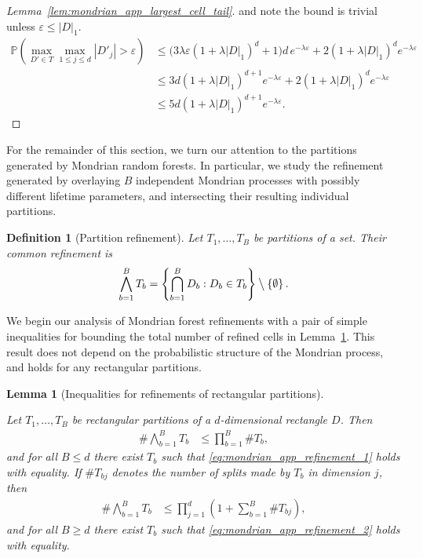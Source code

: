 \documentclass[11pt,lof]{puthesis}
\renewcommand{\P}{\ensuremath{\mathbb{P}}}
\newcommand{\bigsetminus}{\mathbin{\big\backslash}}
\theoremstyle{break}
\newtheorem{lemma}{Lemma}[section]
\newtheorem{definition}{Definition}[section]
\theoremstyle{proof}
\newtheorem{proof}{Proof}
\begin{document}
\begin{proof}[Lemma~\ref{lem:mondrian_app_largest_cell_tail}]
  and note the bound is trivial unless $\varepsilon \leq |D|_1$.
  \begin{align*}
    \P\left(
      \max_{D' \in T}
      \max_{1 \leq j \leq d}
      |D'_j| > \varepsilon
    \right)
    &\leq
    \big( 3 \lambda \varepsilon (1 + \lambda |D|_1)^d + 1 \big)
    d \, e^{-\lambda \varepsilon}
    + 2 (1 + \lambda |D|_1)^d
    e^{-\lambda \varepsilon} \\
    &\leq
    3d (1 + \lambda |D|_1)^{d+1}
    e^{-\lambda \varepsilon}
    + 2 (1 + \lambda |D|_1)^d
    e^{-\lambda \varepsilon} \\
    &\leq
    5d (1 + \lambda |D|_1)^{d+1}
    e^{-\lambda \varepsilon}.
  \end{align*}
\end{proof}

For the remainder of this section, we turn our attention to the partitions
generated by Mondrian random forests. In particular, we study the refinement
generated by overlaying $B$ independent Mondrian processes with possibly
different lifetime parameters, and intersecting their resulting individual
partitions.

\begin{definition}[Partition refinement]%
  Let $T_1, \ldots, T_B$ be partitions of a set.
  Their common refinement is
  \begin{align*}
    \bigwedge_{b=1}^B T_b
    = \left\{
      \bigcap_{b=1}^B D_b:
      D_b \in T_b
    \right\}
    \bigsetminus
    \left\{ \emptyset \right\}.
  \end{align*}
\end{definition}

We begin our analysis of Mondrian forest refinements with a pair of simple
inequalities for bounding the total number of refined cells
in Lemma~\ref{lem:mondrian_app_refinement_inequalities}. This result does not
depend on the probabilistic structure of the Mondrian process, and holds for any
rectangular partitions.

\begin{lemma}[Inequalities for refinements of rectangular partitions]
  \label{lem:mondrian_app_refinement_inequalities}

  Let $T_1, \ldots, T_B$ be rectangular partitions of a $d$-dimensional
  rectangle $D$. Then
  \begin{align}
    \label{eq:mondrian_app_refinement_1}
    \# \bigwedge_{b=1}^B T_b
    &\leq \prod_{b=1}^B \# T_b,
  \end{align}
  and for all $B \leq d$ there exist $T_b$ such that
  \eqref{eq:mondrian_app_refinement_1} holds with equality.
  If $\# T_{b j}$ denotes the number of splits
  made by $T_b$ in dimension $j$, then
  \begin{align}
    \label{eq:mondrian_app_refinement_2}
    \# \bigwedge_{b=1}^B T_b
    &\leq \prod_{j=1}^d
    \left( 1 + \sum_{b=1}^B \# T_{b j} \right),
  \end{align}
  and for all $B \geq d$ there exist $T_b$ such that
  \eqref{eq:mondrian_app_refinement_2} holds with equality.

\end{lemma}
\end{document}
